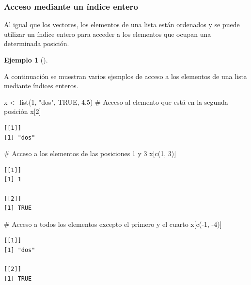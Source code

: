 \documentclass[
  a4paper,
]{scrreport}
\newenvironment{Shaded}{\begin{snugshade}}{\end{snugshade}}
\newcommand{\CommentTok}[1]{\textcolor[rgb]{0.37,0.37,0.37}{#1}}
\newcommand{\ConstantTok}[1]{\textcolor[rgb]{0.56,0.35,0.01}{#1}}
\newcommand{\DecValTok}[1]{\textcolor[rgb]{0.68,0.00,0.00}{#1}}
\newcommand{\FloatTok}[1]{\textcolor[rgb]{0.68,0.00,0.00}{#1}}
\newcommand{\FunctionTok}[1]{\textcolor[rgb]{0.28,0.35,0.67}{#1}}
\newcommand{\NormalTok}[1]{\textcolor[rgb]{0.00,0.23,0.31}{#1}}
\newcommand{\OtherTok}[1]{\textcolor[rgb]{0.00,0.23,0.31}{#1}}
\newcommand{\SpecialCharTok}[1]{\textcolor[rgb]{0.37,0.37,0.37}{#1}}
\newcommand{\StringTok}[1]{\textcolor[rgb]{0.13,0.47,0.30}{#1}}
\theoremstyle{definition}
\theoremstyle{definition}
\newtheorem{example}{Ejemplo}[chapter]
\theoremstyle{remark}
\begin{document}
\hypertarget{acceso-mediante-un-uxedndice-entero-1}{%
\subsubsection{Acceso mediante un índice
entero}\label{acceso-mediante-un-uxedndice-entero-1}}

Al igual que los vectores, los elementos de una lista están ordenados y
se puede utilizar un índice entero para acceder a los elementos que
ocupan una determinada posición.

\leavevmode{}%
\begin{example}[]\label{exm-}

A continuación se muestran varios ejemplos de acceso a los elementos de
una lista mediante índices enteros.

\begin{Shaded}
\begin{Highlighting}[]
\NormalTok{x }\OtherTok{\textless{}{-}} \FunctionTok{list}\NormalTok{(}\DecValTok{1}\NormalTok{, }\StringTok{"dos"}\NormalTok{, }\ConstantTok{TRUE}\NormalTok{, }\FloatTok{4.5}\NormalTok{)}
\CommentTok{\# Acceso al elemento que está en la segunda posición}
\NormalTok{x[}\DecValTok{2}\NormalTok{]}
\end{Highlighting}
\end{Shaded}

\begin{verbatim}
[[1]]
[1] "dos"
\end{verbatim}

\begin{Shaded}
\begin{Highlighting}[]
\CommentTok{\# Acceso a los elementos de las posiciones 1 y 3}
\NormalTok{x[}\FunctionTok{c}\NormalTok{(}\DecValTok{1}\NormalTok{, }\DecValTok{3}\NormalTok{)]}
\end{Highlighting}
\end{Shaded}

\begin{verbatim}
[[1]]
[1] 1

[[2]]
[1] TRUE
\end{verbatim}

\begin{Shaded}
\begin{Highlighting}[]
\CommentTok{\# Acceso a todos los elementos excepto el primero y el cuarto}
\NormalTok{x[}\FunctionTok{c}\NormalTok{(}\SpecialCharTok{{-}}\DecValTok{1}\NormalTok{, }\SpecialCharTok{{-}}\DecValTok{4}\NormalTok{)]}
\end{Highlighting}
\end{Shaded}

\begin{verbatim}
[[1]]
[1] "dos"

[[2]]
[1] TRUE
\end{verbatim}

\end{example}
\end{document}
